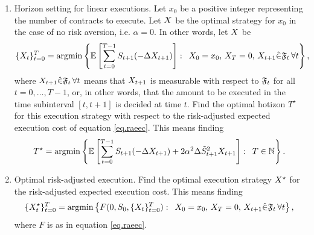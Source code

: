 \documentclass[10pt,a4paper]{article}
\begin{document}
\begin{exercise}
  \begin{enumerate}[label={\textbf{\ref{ex.rapp}.\arabic{*}}}, ref={Exercise {\ref{ex.rapp}.\arabic{*}}}]
    \item
    Horizon setting for linear executions. 
    Let $x_0$ be a positive integer representing the number of contracts to execute. 
    Let $X$ be the optimal strategy for $x_0$ in the case of no risk aversion, i.e. $\alpha=0$.
    In other words, let $X$ be 
    \begin{equation*}
      \lbrace X_t\rbrace_{t=0}^{T}
      =
      \mathrm{argmin} 
      \left \lbrace
      \mathbb{{E}} \left[
        \sum_{t=0}^{T-1} S_{t+1} (-\Delta X_{t+1}) 
      \right]
      : \,\,\, 
      X_0 = x_0 , \,
      X_T = 0 , \, 
      X_{t+1} \hat{\in} \mathfrak{F}_{t}\, \forall t
      \right \rbrace,
    \end{equation*}
    where 
      $X_{t+1} \hat{\in} \mathfrak{F}_{t}\, \forall t$
    means that $X_{t+1}$ is measurable with respect to $\mathfrak{F}_t$ for all $t=0, \dots, T-1$, 
    or, in other words, that the amount to be executed in the time subinterval $[t,t+1]$ is decided at time $t$.
    Find the optimal hotizon $T^{\star}$ for this execution strategy with respect to the risk-adjusted expected execution cost of equation \eqref{eq.raeec}. This means finding
    \begin{equation*}
      T^{\star} = 
      \mathrm{argmin}
      \left \lbrace
      \mathbb{{E}} \left[
        \sum_{t=0}^{T-1} S_{t+1} (-\Delta X_{t+1}) + 2 \alpha^{2} \Delta \tilde{S}^{2}_{t+1} X_{t+1}
      \right]: \, \, \, 
      T \in \mathbb{N}
      \right \rbrace.
    \end{equation*}
  \item
    Optimal risk-adjusted execution.
    Find the optimal execution strategy $X^{\star}$ for the risk-adjusted expected execution cost. 
    This means finding
    \begin{equation*}
      \lbrace X^{\star}_{t}\rbrace_{t=0}^{T}
      =
      \mathrm{argmin}
      \left\lbrace
      F(0, S_{0}, \lbrace X_{t} \rbrace_{t=0}^{T})
      : \,\,\,
      X_0 = x_0, \, 
      X_T = 0, \,
      X_{t+1} \hat{\in} \mathfrak{F}_{t}\, \forall t
      \right \rbrace,
    \end{equation*}
    where $F$ is as in equation \eqref{eq.raeec}. 
  \end{enumerate}
\end{exercise}
\end{document}
